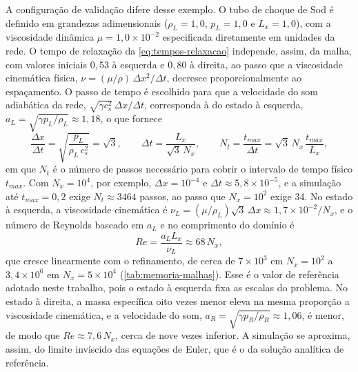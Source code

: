A configuração de validação difere desse exemplo.
O tubo de choque de Sod é definido em grandezas adimensionais ($\rho_L = 1{,}0$, $p_L = 1{,}0$ e $L_x = 1{,}0$), com a viscosidade dinâmica $\mu = 1{,}0 \times 10^{-2}$ especificada diretamente em unidades da rede.
O tempo de relaxação da \eqref{eq:tempos-relaxacao} independe, assim, da malha, com valores iniciais $0{,}53$ à esquerda e $0{,}80$ à direita, ao passo que a viscosidade cinemática física, $\nu = (\mu/\rho)\,\Delta x^2/\Delta t$, decresce proporcionalmente ao espaçamento.
O passo de tempo é escolhido para que a velocidade do som adiabática da rede, $\sqrt{\gamma c_s^2}\,\Delta x/\Delta t$, corresponda à do estado à esquerda, $a_L = \sqrt{\gamma p_L/\rho_L} \approx 1{,}18$, o que fornece
\begin{equation}\label{eq:passo-de-tempo-sod}
    \frac{\Delta x}{\Delta t} = \sqrt{\frac{p_L}{\rho_L\, c_s^2}} = \sqrt{3}, \qquad
    \Delta t = \frac{L_x}{\sqrt{3}\, N_x}, \qquad
    N_t = \frac{t_{max}}{\Delta t} = \sqrt{3}\, N_x\, \frac{t_{max}}{L_x},
\end{equation}
em que $N_t$ é o número de passos necessário para cobrir o intervalo de tempo físico $t_{max}$.
Com $N_x = 10^4$, por exemplo, $\Delta x = 10^{-4}$ e $\Delta t \approx 5{,}8 \times 10^{-5}$, e a simulação até $t_{max} = 0{,}2$ exige $N_t \approx 3464$ passos, ao passo que $N_x = 10^2$ exige $34$.
No estado à esquerda, a viscosidade cinemática é $\nu_L = (\mu/\rho_L)\sqrt{3}\,\Delta x \approx 1{,}7 \times 10^{-2}/N_x$, e o número de Reynolds baseado em $a_L$ e no comprimento do domínio é
\begin{equation}\label{eq:reynolds-sod}
    Re = \frac{a_L L_x}{\nu_L} \approx 68\, N_x,
\end{equation}
que cresce linearmente com o refinamento, de cerca de $7 \times 10^{3}$ em $N_x = 10^{2}$ a $3{,}4 \times 10^{6}$ em $N_x = 5 \times 10^{4}$ (\autoref{tab:memoria-malhas}).
Esse é o valor de referência adotado neste trabalho, pois o estado à esquerda fixa as escalas do problema.
No estado à direita, a massa específica oito vezes menor eleva na mesma proporção a viscosidade cinemática, e a velocidade do som, $a_R = \sqrt{\gamma p_R/\rho_R} \approx 1{,}06$, é menor, de modo que $Re \approx 7{,}6\, N_x$, cerca de nove vezes inferior.
A simulação se aproxima, assim, do limite invíscido das equações de Euler, que é o da solução analítica de referência.


